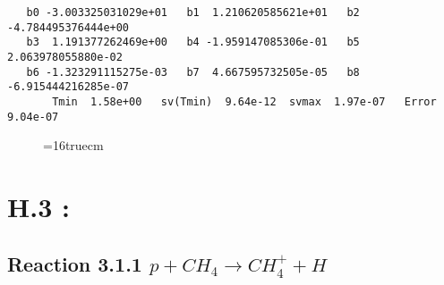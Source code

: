 \documentclass[12pt]{article}
\begin{document}
\begin{small}\begin{verbatim} 
   b0 -3.003325031029e+01   b1  1.210620585621e+01   b2 -4.784495376444e+00
   b3  1.191377262469e+00   b4 -1.959147085306e-01   b5  2.063978055880e-02
   b6 -1.323291115275e-03   b7  4.667595732505e-05   b8 -6.915444216285e-07
       Tmin  1.58e+00   sv(Tmin)  9.64e-12  svmax  1.97e-07   Error  9.04e-07
\end{verbatim}\end{small}

\begin{figure} \label{met.2_2.23}
\epsfxsize=16truecm
\end{figure}
\newpage
 
 
 
 
\section{H.3 :}
 
 
 
\subsection{ 
Reaction 3.1.1    $p + CH_4 \rightarrow CH_4^+ + H$
}
\end{document}
